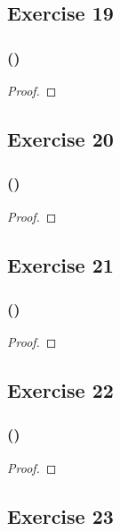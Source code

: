 \documentclass[14pt]{extarticle}
\begin{document}
\subsection{Exercise 19}

\subsubsection{()}

\begin{proof}

\end{proof}

\subsection{Exercise 20}

\subsubsection{()}

\begin{proof}

\end{proof}

\subsection{Exercise 21}

\subsubsection{()}

\begin{proof}

\end{proof}

\subsection{Exercise 22}

\subsubsection{()}

\begin{proof}

\end{proof}

\subsection{Exercise 23}
\end{document}
